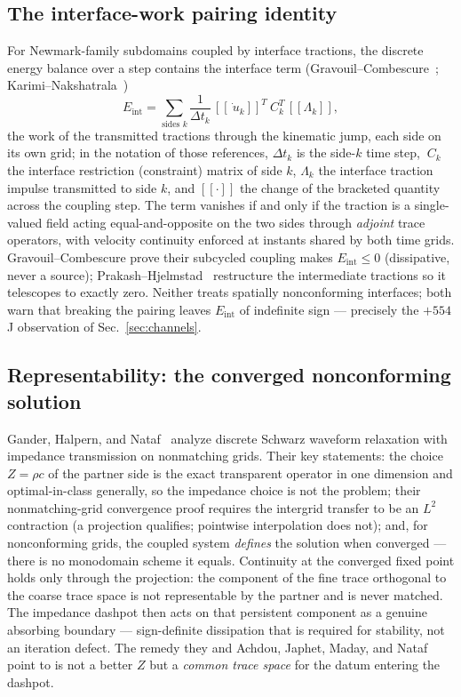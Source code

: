 \documentclass[11pt]{article}
\newcommand{\jump}[1]{[\![#1]\!]}
\begin{document}
\subsection{The interface-work pairing identity}
\label{sec:pairing}

For Newmark-family subdomains coupled by interface tractions, the discrete
energy balance over a step contains the interface term
(Gravouil--Combescure~\cite[Eq.~(34)]{GravouilCombescure2001};
Karimi--Nakshatrala~\cite[Eq.~(84)]{KarimiNakshatrala2014})
\begin{equation}
  E_{\mathrm{int}}
  = \sum_{\text{sides }k} \frac{1}{\Delta t_k}\,
    \jump{\dot{~u}_k}^{T} ~C_k^{T}\, \jump{\Lambda_k},
  \label{eq:eint}
\end{equation}
the work of the transmitted tractions through the kinematic jump, each side
on its own grid; in the notation of those references, $\Delta t_k$ is the
side-$k$ time step, $~C_k$ the interface restriction (constraint) matrix of
side $k$, $\Lambda_k$ the interface traction impulse transmitted to side
$k$, and $\jump{\cdot}$ the change of the bracketed quantity across the
coupling step. The term vanishes if and only if the traction is a
single-valued field acting equal-and-opposite on the two sides through
\emph{adjoint} trace operators, with velocity continuity enforced at
instants shared by both time grids. Gravouil--Combescure prove their
subcycled coupling makes $E_{\mathrm{int}} \le 0$ (dissipative, never a
source); Prakash--Hjelmstad~\cite{PrakashHjelmstad2004} restructure the
intermediate tractions so it telescopes to exactly zero.
Neither treats spatially nonconforming interfaces; both warn that breaking
the pairing leaves $E_{\mathrm{int}}$ of indefinite sign --- precisely the
$+554$\,J observation of Sec.~\ref{sec:channels}.

\subsection{Representability: the converged nonconforming solution}
\label{sec:ghn}

Gander, Halpern, and Nataf~\cite{GanderHalpernNataf2003} analyze discrete
Schwarz waveform relaxation with impedance transmission on nonmatching
grids. Their key
statements: the choice $Z = \rho c$ of the partner side is the exact
transparent operator in one dimension and optimal-in-class generally, so
the impedance choice is not the problem; their nonmatching-grid convergence
proof requires the intergrid transfer to be an $L^2$ contraction (a
projection qualifies; pointwise interpolation does not); and, for
nonconforming grids, the coupled system \emph{defines} the solution when
converged --- there is no monodomain scheme it equals. Continuity at the
converged fixed point holds only through the projection: the component of
the fine trace orthogonal to the coarse trace space is not representable by the
partner and is never matched. The impedance dashpot then acts on that
persistent component as a genuine absorbing boundary --- sign-definite
dissipation that is required for stability, not an iteration defect. The
remedy they and Achdou, Japhet, Maday, and
Nataf~\cite{AchdouJaphetMadayNataf2002} point to is not a better $Z$ but a
\emph{common trace space} for the datum entering the dashpot.
\end{document}
